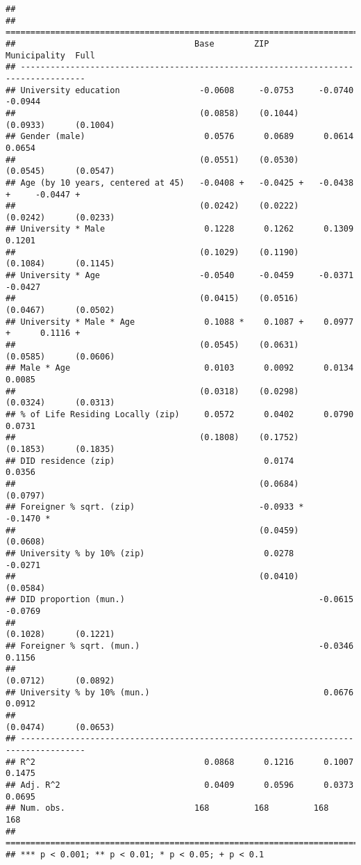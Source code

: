 \documentclass[
]{article}
\begin{document}
\begin{verbatim}
## 
## ===================================================================================
##                                    Base        ZIP         Municipality  Full      
## -----------------------------------------------------------------------------------
## University education                -0.0608     -0.0753     -0.0740       -0.0944  
##                                     (0.0858)    (0.1044)    (0.0933)      (0.1004) 
## Gender (male)                        0.0576      0.0689      0.0614        0.0654  
##                                     (0.0551)    (0.0530)    (0.0545)      (0.0547) 
## Age (by 10 years, centered at 45)   -0.0408 +   -0.0425 +   -0.0438 +     -0.0447 +
##                                     (0.0242)    (0.0222)    (0.0242)      (0.0233) 
## University * Male                    0.1228      0.1262      0.1309        0.1201  
##                                     (0.1029)    (0.1190)    (0.1084)      (0.1145) 
## University * Age                    -0.0540     -0.0459     -0.0371       -0.0427  
##                                     (0.0415)    (0.0516)    (0.0467)      (0.0502) 
## University * Male * Age              0.1088 *    0.1087 +    0.0977 +      0.1116 +
##                                     (0.0545)    (0.0631)    (0.0585)      (0.0606) 
## Male * Age                           0.0103      0.0092      0.0134        0.0085  
##                                     (0.0318)    (0.0298)    (0.0324)      (0.0313) 
## % of Life Residing Locally (zip)     0.0572      0.0402      0.0790        0.0731  
##                                     (0.1808)    (0.1752)    (0.1853)      (0.1835) 
## DID residence (zip)                              0.0174                    0.0356  
##                                                 (0.0684)                  (0.0797) 
## Foreigner % sqrt. (zip)                         -0.0933 *                 -0.1470 *
##                                                 (0.0459)                  (0.0608) 
## University % by 10% (zip)                        0.0278                   -0.0271  
##                                                 (0.0410)                  (0.0584) 
## DID proportion (mun.)                                       -0.0615       -0.0769  
##                                                             (0.1028)      (0.1221) 
## Foreigner % sqrt. (mun.)                                    -0.0346        0.1156  
##                                                             (0.0712)      (0.0892) 
## University % by 10% (mun.)                                   0.0676        0.0912  
##                                                             (0.0474)      (0.0653) 
## -----------------------------------------------------------------------------------
## R^2                                  0.0868      0.1216      0.1007        0.1475  
## Adj. R^2                             0.0409      0.0596      0.0373        0.0695  
## Num. obs.                          168         168         168           168       
## ===================================================================================
## *** p < 0.001; ** p < 0.01; * p < 0.05; + p < 0.1
\end{verbatim}
\end{document}
